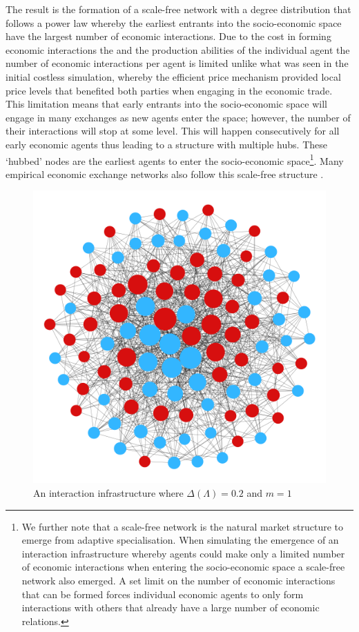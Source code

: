 The result is the formation of a scale-free network with a degree distribution that follows a power law whereby the earliest entrants into the socio-economic space have the largest number of economic interactions. Due to the cost in forming economic interactions the and the production abilities of the individual agent the number of economic interactions per agent is limited unlike what was seen in the initial costless simulation, whereby the efficient price mechanism provided local price levels that benefited both parties when engaging in the economic trade. This limitation means that early entrants into the socio-economic space will engage in many exchanges as new agents enter the space; however, the number of their interactions will stop at some level. This will happen consecutively for all early economic agents thus leading to a structure with multiple hubs. These `hubbed' nodes are the earliest agents to enter the socio-economic space\footnote{We further note that a scale-free network is the natural market structure to emerge from adaptive specialisation. When simulating the emergence of an interaction infrastructure whereby agents could make only a limited number of economic interactions when entering the socio-economic space a scale-free network also emerged. A set limit on the number of economic interactions that can be formed forces individual economic agents to only form interactions with others that already have a large number of economic relations.}. Many empirical economic exchange networks also follow this scale-free structure \citep{Schweitzer2009}.

\begin{figure}[t]
\centering
\includegraphics[scale=0.22]{Images/Sim3C.png}
\caption{An interaction infrastructure where $\Delta(\Lambda)=0.2$ and $m=1$}
\label{Sim7}
\end{figure}

